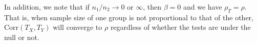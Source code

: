 \documentclass[12pt, a4paper]{article}
\newtheorem{corollary}{corollary}
\newcommand{\cor}{\text{Corr}}
\begin{document}
	 In addition, we note that if $n_1/n_2 \rightarrow 0$ or $\infty$, then $\beta = 0$ and we have $\rho_T = \rho$. That is, when sample size of one group is not proportional to that of the other, $\cor(T_X, T_Y)$ will converge to $\rho$ regardless of whether the tests are under the null or not. 	

	
	
\end{document}
